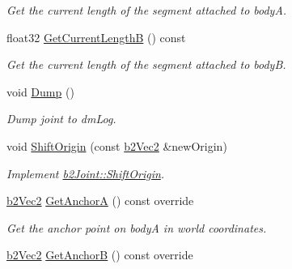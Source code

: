 \begin{DoxyCompactItemize}
\begin{DoxyCompactList}\small\item\em Get the current length of the segment attached to bodyA. \end{DoxyCompactList}\item 
\mbox{\label{classb2PulleyJoint_aa2d15dc26b2df0a446ccda652058085d}} 
float32 \hyperlink{classb2PulleyJoint_aa2d15dc26b2df0a446ccda652058085d}{Get\+Current\+LengthB} () const
\begin{DoxyCompactList}\small\item\em Get the current length of the segment attached to bodyB. \end{DoxyCompactList}\item 
\mbox{\label{classb2PulleyJoint_ad12d0e03b5d07b2f8af1005c95c67aa2}} 
void \hyperlink{classb2PulleyJoint_ad12d0e03b5d07b2f8af1005c95c67aa2}{Dump} ()
\begin{DoxyCompactList}\small\item\em Dump joint to dm\+Log. \end{DoxyCompactList}\item 
\mbox{\label{classb2PulleyJoint_a5b88d498ce306c4ff5ce99dec4811825}} 
void \hyperlink{classb2PulleyJoint_a5b88d498ce306c4ff5ce99dec4811825}{Shift\+Origin} (const \hyperlink{structb2Vec2}{b2\+Vec2} \&new\+Origin)
\begin{DoxyCompactList}\small\item\em Implement \hyperlink{classb2Joint_a7804f649e993dc0fd9ae47fde5601f90}{b2\+Joint\+::\+Shift\+Origin}. \end{DoxyCompactList}\item 
\mbox{\label{classb2PulleyJoint_af7167643e6d72d879eea619a368194c1}} 
\hyperlink{structb2Vec2}{b2\+Vec2} \hyperlink{classb2PulleyJoint_af7167643e6d72d879eea619a368194c1}{Get\+AnchorA} () const override
\begin{DoxyCompactList}\small\item\em Get the anchor point on bodyA in world coordinates. \end{DoxyCompactList}\item 
\mbox{\label{classb2PulleyJoint_aee56f103c1d1d30fcbd3a8570e321ba9}} 
\hyperlink{structb2Vec2}{b2\+Vec2} \hyperlink{classb2PulleyJoint_aee56f103c1d1d30fcbd3a8570e321ba9}{Get\+AnchorB} () const override

\end{DoxyCompactItemize}

